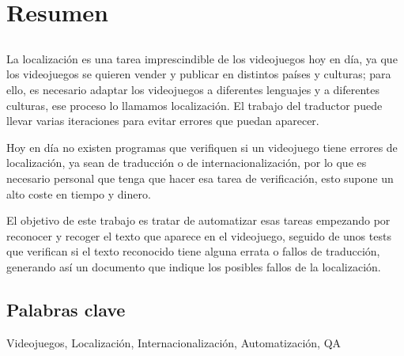 \chapter*{Resumen}

\section*{\tituloPortadaVal}

La localización es una tarea imprescindible de los videojuegos hoy en día, ya que los videojuegos se quieren vender y publicar en distintos países y culturas; para ello, es necesario adaptar los videojuegos a diferentes lenguajes y a diferentes culturas, ese proceso lo llamamos localización. El trabajo del traductor puede llevar varias iteraciones  para evitar errores que puedan aparecer.

Hoy en día no existen programas que verifiquen si un videojuego tiene errores de localización, ya sean de traducción o de internacionalización, por lo que es necesario personal que tenga que hacer esa tarea de verificación, esto supone un alto coste en tiempo y dinero.

El objetivo de este trabajo es tratar de automatizar esas tareas empezando por reconocer y recoger el texto que aparece en el videojuego, seguido de unos tests que verifican si el texto reconocido tiene alguna errata o fallos de traducción, generando así un documento que indique los posibles fallos de la localización.



\section*{Palabras clave}
   
\noindent Videojuegos, Localización, Internacionalización, Automatización, QA

   


